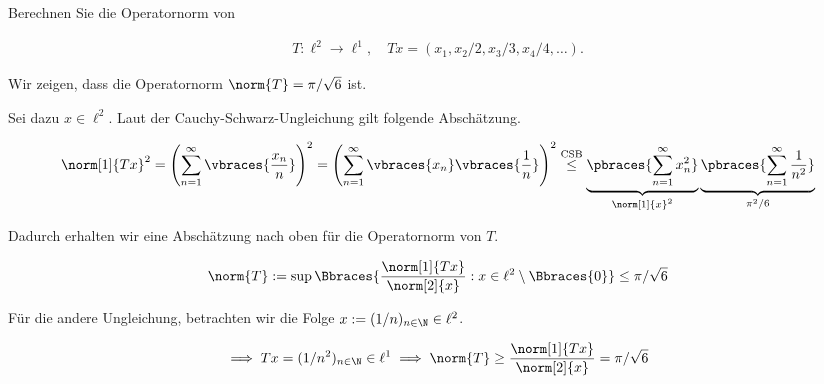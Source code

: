 
\begin{exercise}

Berechnen Sie die Operatornorm von

\begin{align*}
    T: \ell^2 \to \ell^1,
    \quad
    Tx = (x_1, x_2 / 2, x_3 / 3, x_4 / 4, \ldots).
\end{align*}

\end{exercise}


\begin{solution}

Wir zeigen, dass die Operatornorm $\norm{T} = \pi / \sqrt{6}$ ist.

Sei dazu $x \in \ell^2$.
Laut der Cauchy-Schwarz-Ungleichung gilt folgende Abschätzung.

\begin{align*}
    \norm[1]{Tx}^2
    =
    \left(\sum_{n=1}^\infty
    \vbraces
    {
        \frac{x_n}{n}
    }\right)^2
    =
    \left(\sum_{n=1}^\infty
    \vbraces{x_n}
    \vbraces
    {
        \frac{1}{n}
    }\right)^2
    \stackrel{\text{CSB}}{\leq}
    \underbrace
    {
        \pbraces
        {
            \sum_{n=1}^\infty
            x_n^2
        }
    }_{
        \norm[1]{x}^2
    }
    \underbrace
    {
        \pbraces
        {
            \sum_{n=1}^\infty
            \frac{1}{n^2}
        }
    }_{
        \pi^2 / 6
    }
\end{align*}

Dadurch erhalten wir eine Abschätzung nach oben für die Operatornorm von $T$.

\begin{align*}
    \norm{T}
    :=
    \sup
    \Bbraces
    {
        \frac
        {
            \norm[1]{Tx}
        }{
            \norm[2]{x}
        }:
        x \in \ell^2 \setminus \Bbraces{0}
    }
    \leq
    \pi / \sqrt{6}
\end{align*}

Für die andere Ungleichung, betrachten wir die Folge $x := (1/n)_{n \in \N} \in \ell^2$.

\begin{align*}
    \implies
    Tx = (1/n^2)_{n \in \N} \in \ell^1
    \implies
    \norm{T}
    \geq
    \frac
        {
            \norm[1]{Tx}
        }{
            \norm[2]{x}
        }
    =
    \pi / \sqrt{6}
\end{align*}

\end{solution}

